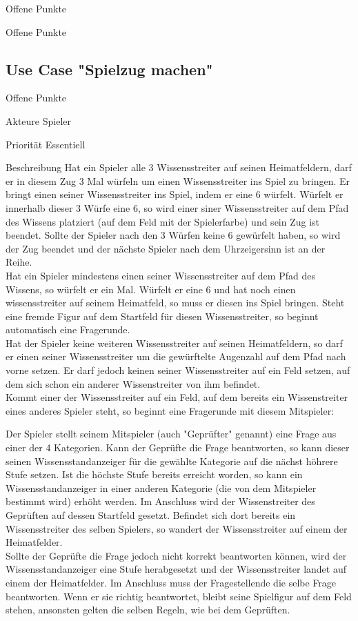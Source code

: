 \begin{labeling}[:]{Offene Punkte}
\begin{labeling}[:]{Offene Punkte}
\subsection{Use Case "Spielzug machen"}
\begin{labeling}[:]{Offene Punkte}
\item [Akteure] Spieler
\item [Priorität] Essentiell
\item [Beschreibung] Hat ein Spieler alle 3 Wissensstreiter auf seinen Heimatfeldern, darf er in diesem Zug 3 Mal würfeln um einen Wissensstreiter ins Spiel zu bringen. Er bringt einen seiner Wissensstreiter ins Spiel, indem er eine 6 würfelt. Würfelt er innerhalb dieser 3 Würfe eine 6, so wird einer siner Wissensstreiter auf dem Pfad des Wissens platziert (auf dem Feld mit der Spielerfarbe) und sein Zug ist beendet. Sollte der Spieler nach den 3 Würfen keine 6 gewürfelt haben, so wird der Zug beendet und der nächste Spieler nach dem Uhrzeigersinn ist an der Reihe. \\
Hat ein Spieler mindestens einen seiner Wissensstreiter auf dem Pfad des Wissens, so würfelt er ein Mal. Würfelt er eine 6 und hat noch einen wissensstreiter auf seinem Heimatfeld, so muss er diesen ins Spiel bringen. Steht eine fremde Figur auf dem Startfeld für diesen Wissensstreiter, so beginnt automatisch eine Fragerunde. \\
Hat der Spieler keine weiteren Wissensstreiter auf seinen Heimatfeldern, so darf er einen seiner Wissensstreiter um die gewürftelte Augenzahl auf dem Pfad nach vorne setzen. Er darf jedoch keinen seiner Wissensstreiter auf ein Feld setzen, auf dem sich schon ein anderer Wissenstreiter von ihm befindet. \\
Kommt einer der Wissensstreiter auf ein Feld, auf dem bereits ein Wissenstreiter eines anderes Spieler steht, so beginnt eine Fragerunde mit diesem Mitspieler:

Der Spieler stellt seinem Mitspieler (auch "Geprüfter" genannt) eine Frage aus einer der 4 Kategorien. Kann der Geprüfte die Frage beantworten, so kann dieser seinen Wissensstandanzeiger für die gewählte Kategorie auf die nächst höhrere Stufe setzen. Ist die höchste Stufe bereits erreicht worden, so kann ein Wissensstandanzeiger in einer anderen Kategorie (die von dem Mitspieler bestimmt wird) erhöht werden. Im Anschluss wird der Wissenstreiter des Geprüften auf dessen Startfeld gesetzt. Befindet sich dort bereits ein Wissensstreiter des selben Spielers, so wandert der Wissensstreiter auf einem der Heimatfelder. \\
Sollte der Geprüfte die Frage jedoch nicht korrekt beantworten können, wird der Wissensstandanzeiger eine Stufe herabgesetzt und der Wissensstreiter landet auf einem der Heimatfelder. Im Anschluss muss der Fragestellende die selbe Frage beantworten. Wenn er sie richtig beantwortet, bleibt seine Spielfigur auf dem Feld stehen, ansonsten gelten die selben Regeln, wie bei dem Geprüften. \\


\end{labeling}
\end{labeling}
\end{labeling}
